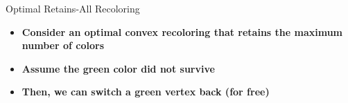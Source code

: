 \begin{frame}{Optimal Retains-All Recoloring}

\begin{itemize}

\item \textbf<1>
{Consider an optimal convex recoloring that retains the maximum number of colors}

\item \textbf<2>
{Assume the green color did not survive}

\item \textbf<3>
{Then, we can switch a green vertex back (for free)}

\end{itemize}



\end{frame}